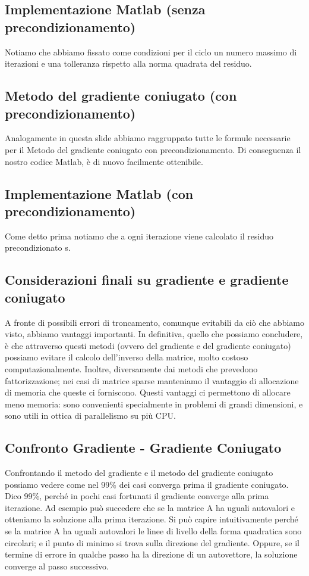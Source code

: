 \documentclass[a4paper]{article}
\begin{document}
\subsection*{Implementazione Matlab (senza precondizionamento)}
Notiamo che abbiamo fissato come condizioni per il ciclo un numero massimo di iterazioni e una tolleranza rispetto alla norma quadrata del residuo.

\subsection*{Metodo del gradiente coniugato (con precondizionamento)}
Analogamente in questa slide abbiamo raggruppato tutte le formule necessarie per il Metodo del gradiente coniugato con precondizionamento.
Di conseguenza il nostro codice Matlab, è di nuovo facilmente ottenibile.

\subsection*{Implementazione Matlab (con precondizionamento)}
Come  detto prima notiamo che a ogni iterazione viene calcolato il residuo precondizionato s.

\subsection*{Considerazioni finali su gradiente e gradiente coniugato}
A fronte di possibili errori di troncamento, comunque evitabili da ciò che abbiamo visto, abbiamo vantaggi importanti.
In definitiva, quello che possiamo concludere, è che attraverso questi metodi (ovvero del gradiente e del gradiente coniugato) possiamo evitare il calcolo dell’inverso della matrice, molto costoso computazionalmente.
Inoltre, diversamente dai metodi che prevedono fattorizzazione; nei casi di matrice sparse manteniamo il vantaggio di allocazione di memoria che queste ci forniscono.
Questi vantaggi ci permettono di allocare meno memoria: sono convenienti specialmente in problemi di grandi dimensioni, e sono utili in ottica di parallelismo su più CPU.

\subsection*{Confronto Gradiente - Gradiente Coniugato}
Confrontando il metodo del gradiente e il metodo del gradiente coniugato possiamo vedere come nel 99\% dei casi converga prima il gradiente coniugato.
Dico 99\%, perché in pochi casi fortunati il gradiente converge alla prima iterazione.
Ad esempio può succedere che se la matrice A ha uguali autovalori e otteniamo la soluzione alla prima iterazione. Si può capire intuitivamente perché se la matrice A ha uguali autovalori le linee di livello della forma quadratica sono circolari; e il punto di minimo si trova sulla direzione del gradiente.
Oppure, se il termine di errore in qualche passo ha la direzione di un autovettore, la soluzione converge al passo successivo.
\end{document}

